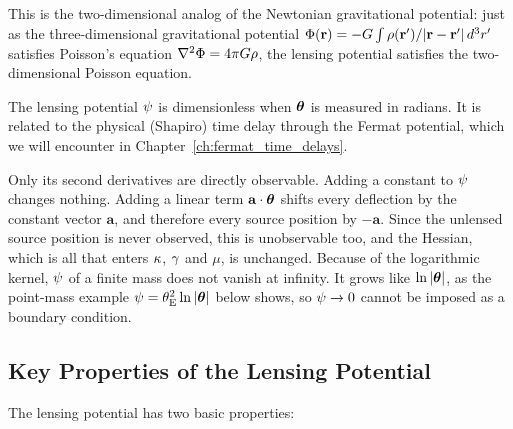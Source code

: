 This is the two-dimensional analog of the Newtonian gravitational
potential: just as the three-dimensional gravitational potential
$\Phi(\mathbf{r}) = -G \int \rho(\mathbf{r}')/|\mathbf{r} -
\mathbf{r}'|\, d^3r'$ satisfies Poisson's equation
$\nabla^2\Phi = 4\pi G\rho$, the lensing potential satisfies
the two-dimensional Poisson equation.

\begin{remark}
The lensing potential $\psi$ is dimensionless when $\boldsymbol{\theta}$ is
measured in radians.  It is related to the physical (Shapiro) time
delay through the Fermat potential, which we will encounter in
Chapter~\ref{ch:fermat_time_delays}.
\end{remark}
\begin{annotation}
Only its second derivatives are directly observable. Adding a constant to $\psi$
changes nothing. Adding a linear term $\mathbf{a}\cdot\boldsymbol{\theta}$ shifts every
deflection by the constant vector $\mathbf{a}$, and therefore every source position by
$-\mathbf{a}$. Since the unlensed source position is never observed, this is
unobservable too, and the Hessian, which is all that enters $\kappa$, $\gamma$ and
$\mu$, is unchanged. Because of the logarithmic kernel, $\psi$ of a
finite mass does not vanish at infinity. It grows like
$\ln|\boldsymbol{\theta}|$, as the point-mass example $\psi = \theta_{\mathrm{E}}^2\ln|\boldsymbol{\theta}|$
below shows, so $\psi \to 0$ cannot be imposed as a boundary condition.
\end{annotation}

\subsection{Key Properties of the Lensing Potential}

The lensing potential has two basic properties:

